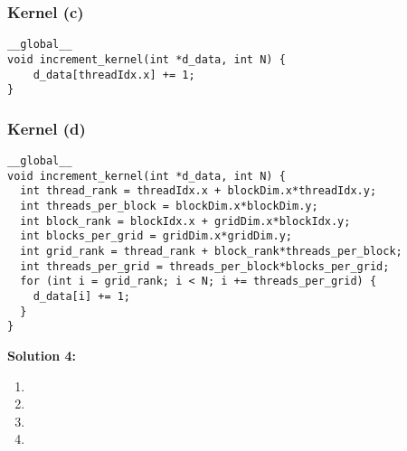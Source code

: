 \documentclass[]{article}
\begin{document}
\subsubsection*{Kernel (c)}
\begin{lstlisting}
__global__
void increment_kernel(int *d_data, int N) {
    d_data[threadIdx.x] += 1;
}
\end{lstlisting}

\subsubsection*{Kernel (d)}
{\small
\begin{lstlisting}
__global__
void increment_kernel(int *d_data, int N) {
  int thread_rank = threadIdx.x + blockDim.x*threadIdx.y;
  int threads_per_block = blockDim.x*blockDim.y;
  int block_rank = blockIdx.x + gridDim.x*blockIdx.y;
  int blocks_per_grid = gridDim.x*gridDim.y;
  int grid_rank = thread_rank + block_rank*threads_per_block;
  int threads_per_grid = threads_per_block*blocks_per_grid;
  for (int i = grid_rank; i < N; i += threads_per_grid) {
    d_data[i] += 1;
  }
}
\end{lstlisting}}
\textbf{Solution 4:}
\begin{enumerate}[label=(\alph*)]
    \item 
    \item 
    \item 
    \item 
\end{enumerate}
\end{document}
